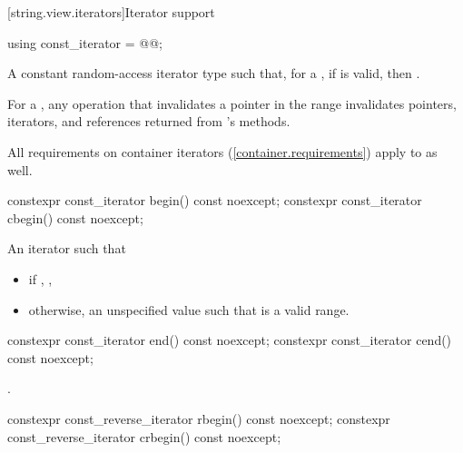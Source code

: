 [string.view.iterators]{Iterator support}

%
\begin{itemdecl}
using const_iterator = @@;
\end{itemdecl}

\begin{itemdescr}
\pnum
A constant random-access iterator type such that,
for a ,
if  is valid,
then .

\pnum
For a , any operation that invalidates a pointer in the range  invalidates pointers, iterators, and references returned from 's methods.

\pnum
All requirements on container iterators (\ref{container.requirements}) apply to  as well.
\end{itemdescr}

%
%
\begin{itemdecl}
constexpr const_iterator begin() const noexcept;
constexpr const_iterator cbegin() const noexcept;
\end{itemdecl}

\begin{itemdescr}
\pnum
\returns
An iterator such that
\begin{itemize}
\item if , ,
\item otherwise, an unspecified value such that  is a valid range.
\end{itemize}
\end{itemdescr}

%
%
\begin{itemdecl}
constexpr const_iterator end() const noexcept;
constexpr const_iterator cend() const noexcept;
\end{itemdecl}

\begin{itemdescr}
\pnum
\returns
{}.
\end{itemdescr}

%
%
\begin{itemdecl}
constexpr const_reverse_iterator rbegin() const noexcept;
constexpr const_reverse_iterator crbegin() const noexcept;
\end{itemdecl}

